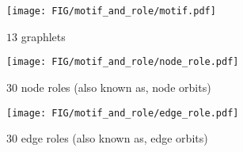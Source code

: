 
\begin{figure*}[t]
    \centering
    \begin{subfigure}{0.19\textwidth}\captionsetup{justification=centering} 
        \texttt{[image: FIG/motif\_and\_role/motif.pdf]}
        \caption{$13$ graphlets}
     \end{subfigure}
     \hspace{1mm} %
     \begin{subfigure}{0.39\textwidth}
        \texttt{[image: FIG/motif\_and\_role/node\_role.pdf]}
        \caption{$30$ node roles (also known as, node orbits)}
     \end{subfigure}
     \begin{subfigure}{0.39\textwidth}
        \texttt{[image: FIG/motif\_and\_role/edge\_role.pdf]}
        \caption{$30$ edge roles (also known as, edge orbits) }
     \end{subfigure}
      \caption{\label{fig:graphlet_and_role} (a) The 13 graphlets \cite{prvzulj2007biological} with three nodes. (b) The 30 node roles \cite{prvzulj2007biological} within the graphlets (see the positions of black nodes). (c) The 30 edge roles within the graphlets (see the positions of edges from a red node to a blue node).
      }
\end{figure*}






